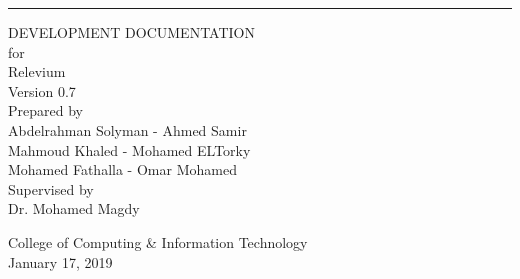 \documentclass{scrreprt}
\date{January 17, 2019}
\def\myversion{0.7}
\begin{document}
\begin{flushright}
    \rule{16cm}{5pt}\vskip1cm
    \begin{bfseries}
        \Huge{DEVELOPMENT DOCUMENTATION}\\
        \vspace{1cm}
        for\\
        \vspace{1cm}
        Relevium\\
        \vspace{1cm}
        \LARGE{Version \myversion}\\
        \vspace{1cm}
        Prepared by\\
        Abdelrahman Solyman - 
        Ahmed Samir \\
        Mahmoud Khaled -
        Mohamed ELTorky \\ 
        Mohamed Fathalla -
        Omar Mohamed\\
        
        \vspace{1cm}
        Supervised by\\
        Dr. Mohamed Magdy

        \vspace{1.2cm}
        College of Computing \& Information Technology\\
        \vspace{1.2cm}
      January 17, 2019  \\
    \end{bfseries}
\end{flushright}


\tableofcontents
\listoffigures
\end{document}
